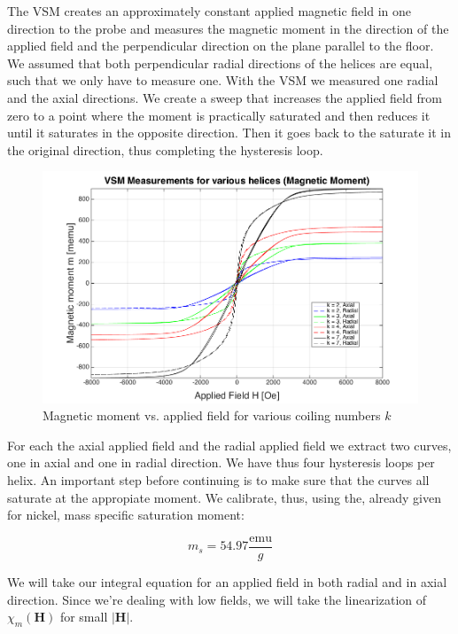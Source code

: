 The VSM creates an approximately constant applied magnetic field in one direction to the probe and measures the magnetic moment in the direction of the applied field and the perpendicular direction on the plane parallel to the floor. 
We assumed  that both perpendicular radial directions of the helices are equal, such that we only have to measure one. With the VSM we measured one radial and the axial directions. We create a sweep that increases the applied field from zero to a point where the moment is practically saturated and then reduces it until it saturates in the opposite direction. Then it goes back to the saturate it in the original direction, thus completing the hysteresis loop.\\

\begin{figure}[ht]
	\centering
  \includegraphics[width=1\textwidth]{Pictures/VSM_Moment.png}
	\caption{Magnetic moment vs. applied field for various coiling numbers $k$}
	\label{fig:VSM_Moment}
\end{figure}

For each the axial applied field and the radial applied field we extract two curves, one in axial and one in radial direction. We have thus four hysteresis loops per helix. An important step before continuing is to make sure that the curves all saturate at the appropiate moment. We calibrate, thus, using the, already given for nickel, mass specific saturation moment:

\begin{equation}
m_s = 54.97 \frac{\text{emu}}{g}
\end{equation}

We will take our integral equation for an applied field in both radial and in axial direction. Since we're dealing with low fields, we will take the linearization of $\chi_m(\textbf{H})$ for small $|\textbf{H}|$. 

